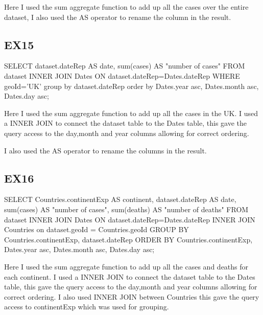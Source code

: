 \documentclass{report}
\begin{document}
	Here I used the sum aggregate function to add up all the cases over the entire dataset, I also used the AS operator to rename the column in the result.
	
	\subsection{EX15}
	SELECT dataset.dateRep AS date, \newline
	sum(cases) AS "number of cases" \newline
	FROM dataset INNER JOIN Dates ON dataset.dateRep=Dates.dateRep \newline
	WHERE geoId='UK' group by dataset.dateRep \newline
	order by Dates.year asc, Dates.month asc, Dates.day asc;\newline
	
	Here I used the sum aggregate function to add up all the cases in the UK. I used a INNER JOIN to connect the dataset table to the Dates table, this gave the query access to the day,month and year columns allowing for correct ordering.\newline
	
	I also used the AS operator to rename the columns in the result.
	
	
	
	\subsection{EX16}
	SELECT Countries.continentExp AS continent, \newline
	dataset.dateRep AS date, \newline
	sum(cases) AS "number of cases",\newline
	sum(deaths) AS "number of deaths" \newline
	FROM dataset \newline
	INNER JOIN Dates ON dataset.dateRep=Dates.dateRep \newline
	INNER JOIN Countries on dataset.geoId = Countries.geoId \newline
	GROUP BY Countries.continentExp, dataset.dateRep \newline
	ORDER BY Countries.continentExp, Dates.year asc, Dates.month asc, Dates.day asc;\newline
	
	
	Here I used the sum aggregate function to add up all the cases and deaths for each continent. I used a INNER JOIN to connect the dataset table to the Dates table, this gave the query access to the day,month and year columns allowing for correct ordering. I also used INNER JOIN between Countries this gave the query access to continentExp which was used for grouping.\newline
	
\end{document}
